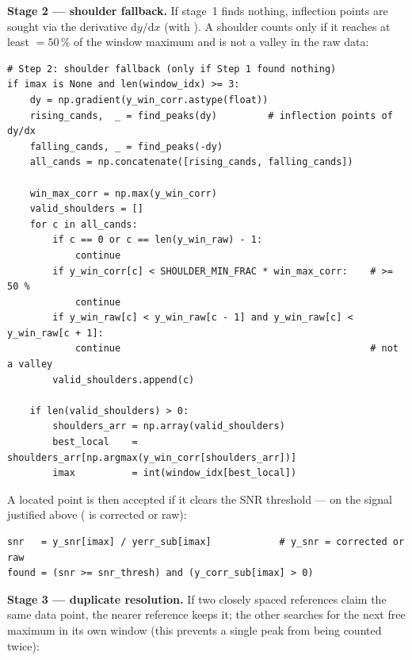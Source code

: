 \documentclass[11pt,a4paper]{article}
\begin{document}
\textbf{Stage 2 --- shoulder fallback.} If stage~1 finds nothing, inflection
points are sought via the derivative $\mathrm{d}y/\mathrm{d}x$ (with
). A shoulder counts only if it reaches at least
${}=50\,\%$ of the window maximum and is not a valley in
the raw data:

\begin{lstlisting}[style=py]
# Step 2: shoulder fallback (only if Step 1 found nothing)
if imax is None and len(window_idx) >= 3:
    dy = np.gradient(y_win_corr.astype(float))
    rising_cands,  _ = find_peaks(dy)         # inflection points of dy/dx
    falling_cands, _ = find_peaks(-dy)
    all_cands = np.concatenate([rising_cands, falling_cands])

    win_max_corr = np.max(y_win_corr)
    valid_shoulders = []
    for c in all_cands:
        if c == 0 or c == len(y_win_raw) - 1:
            continue
        if y_win_corr[c] < SHOULDER_MIN_FRAC * win_max_corr:    # >= 50 %
            continue
        if y_win_raw[c] < y_win_raw[c - 1] and y_win_raw[c] < y_win_raw[c + 1]:
            continue                                            # not a valley
        valid_shoulders.append(c)

    if len(valid_shoulders) > 0:
        shoulders_arr = np.array(valid_shoulders)
        best_local    = shoulders_arr[np.argmax(y_win_corr[shoulders_arr])]
        imax          = int(window_idx[best_local])
\end{lstlisting}

A located point is then accepted if it clears the SNR threshold --- on the signal
justified above ( is corrected or raw):

\begin{lstlisting}[style=py]
snr   = y_snr[imax] / yerr_sub[imax]            # y_snr = corrected or raw
found = (snr >= snr_thresh) and (y_corr_sub[imax] > 0)
\end{lstlisting}

\textbf{Stage 3 --- duplicate resolution.} If two closely spaced references claim
the same data point, the nearer reference keeps it; the other searches for the
next free maximum in its own window (this prevents a single peak from being
counted twice):
\end{document}
